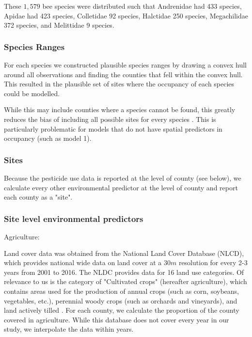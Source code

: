 \documentclass[12pt]{article}
\begin{document}
These $1,579$ bee species were distributed such that Andrenidae had 433 species, Apidae had 423 species, Colletidae 92 species, Halctidae 250 species, Megachilidae 372 species, and Melittidae 9 species. 

\subsubsection{Species Ranges}

For each species we constructed plausible species ranges by drawing a convex hull around all observations and finding the counties that fell within the convex hull. This resulted in the plausible set of sites where the occupancy of each species could be modelled. 

While this may include counties where a species cannot be found, this greatly reduces the bias of including all possible sites for every species \citep{guzman2021using, Shirey-2022}. This is particularly problematic for models that do not have spatial predictors in occupancy (such as model 1).

\subsubsection{Sites}

Because the pesticide use data is reported at the level of county (see below), we calculate every other environmental predictor at the level of county and report each county as a "site". 

\subsubsection{Site level environmental predictors}

Agriculture: 

Land cover data was obtained from the National Land Cover Database (NLCD), which provides national wide data on land cover at a $30m$ resolution for every 2-3 years from 2001 to 2016. The NLDC provides data for 16 land use categories. Of relevance to us is the category of "Cultivated crops" (hereafter agriculture), which contains areas used for the production of annual crops (such as corn, soybeans, vegetables, etc.), perennial woody crops (such as orchards and vineyards), and land actively tilled \citep{homer2020conterminous, jin2019overall}. For each county, we calculate the proportion of the county covered in agriculture. While this database does not cover every year in our study, we interpolate the data within years. 
\end{document}
